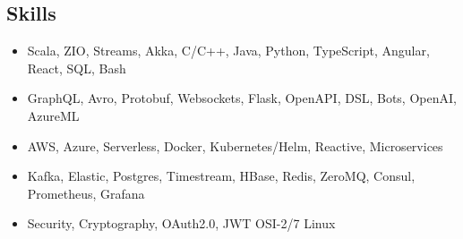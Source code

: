 \subsection*{Skills}

\begin{itemize}[noitemsep, nosep]
  \item Scala, ZIO, Streams, Akka, C/C++, Java, Python, TypeScript, Angular, React, SQL, Bash
  \item GraphQL, Avro, Protobuf, Websockets, Flask, OpenAPI, DSL, Bots, OpenAI, AzureML
  \item AWS, Azure, Serverless, Docker, Kubernetes/Helm, Reactive, Microservices
  \item Kafka, Elastic, Postgres, Timestream, HBase, Redis, ZeroMQ, Consul, Prometheus, Grafana
  \item Security, Cryptography, OAuth2.0, JWT \textbar{} OSI-2/7 \textbar{} Linux
\end{itemize}